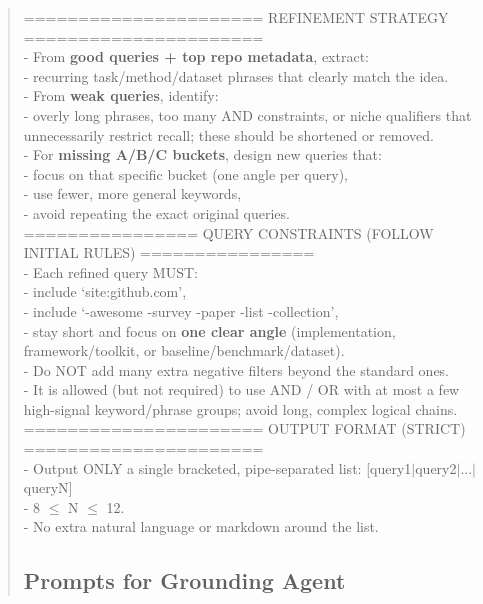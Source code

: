 \begin{quote}
\begin{tcolorbox}[breakable,colback=search!20!white, colframe=search!60!black, title=\textbf{Prompt for Search Agent (Query Refinement - Code)}]
        ====================== REFINEMENT STRATEGY ======================\\
        - From \textbf{good queries + top repo metadata}, extract:\\
        - recurring task/method/dataset phrases that clearly match the idea.\\
        - From \textbf{weak queries}, identify:\\
        - overly long phrases, too many AND constraints, or niche qualifiers that unnecessarily restrict recall; these should be shortened or removed.\\
        - For \textbf{missing A/B/C buckets}, design new queries that:\\
        - focus on that specific bucket (one angle per query),\\
        - use fewer, more general keywords,\\
        - avoid repeating the exact original queries.\\

        ================ QUERY CONSTRAINTS (FOLLOW INITIAL RULES) ================\\
        - Each refined query MUST:\\
        - include `site:github.com',\\
        - include `-awesome -survey -paper -list -collection',\\
        - stay short and focus on \textbf{one clear angle} (implementation, framework/toolkit, or baseline/benchmark/dataset).\\
        - Do NOT add many extra negative filters beyond the standard ones.\\
        - It is allowed (but not required) to use AND / OR with at most a few high-signal keyword/phrase groups; avoid long, complex logical chains.\\

        ====================== OUTPUT FORMAT (STRICT) ======================\\
        - Output ONLY a single bracketed, pipe-separated list: [query1$\mid$query2$\mid$...$\mid$queryN]\\
        - 8 $\leq$ N $\leq$ 12.\\
        - No extra natural language or markdown around the list.
    \end{tcolorbox}

\subsection{Prompts for Grounding Agent}
\label{app:prompts_grounding}


\end{quote}
